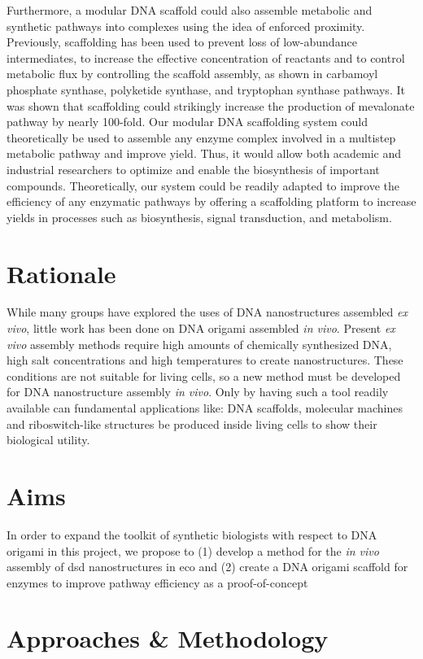\documentclass[a4paper]{article}
\begin{document}
Furthermore, a modular DNA scaffold could also assemble metabolic and synthetic pathways into complexes using the idea of enforced proximity.
Previously, scaffolding has been used to prevent loss of low-abundance intermediates, to increase the effective concentration of reactants and to control metabolic flux by controlling the scaffold assembly, as shown in carbamoyl phosphate synthase, polyketide synthase, and tryptophan synthase pathways\cite{intro13,intro14,intro15}.
It was shown that scaffolding could strikingly increase the production of mevalonate pathway by nearly 100-fold\cite{intro16}.
Our modular DNA scaffolding system could theoretically be used to assemble any enzyme complex involved in a multistep metabolic pathway and improve yield.
Thus, it would allow both academic and industrial researchers to optimize and enable the biosynthesis of important compounds.
Theoretically, our system could be readily adapted to improve the efficiency of any enzymatic pathways by offering a scaffolding platform to increase yields in processes such as biosynthesis, signal transduction, and metabolism\cite{tab7}.
\section*{Rationale}
While many groups have explored the uses of DNA nanostructures assembled \textit{ex vivo}, little work has been done on DNA origami assembled \textit{in vivo}.
Present \textit{ex vivo} assembly methods require high amounts of chemically synthesized DNA, high salt concentrations and high temperatures to create nanostructures.
These conditions are not suitable for living cells, so a new method must be developed for DNA nanostructure assembly \textit{in vivo}.
Only by having such a tool readily available can fundamental applications like: DNA scaffolds,  molecular machines and riboswitch-like structures be produced inside living cells to show their biological utility.
\section*{Aims}
In order to expand the toolkit of synthetic biologists with respect to DNA origami in this project, we propose to (1) develop a method for the \textit{in vivo} assembly of \ac{dsd} nanostructures in \ac{eco} and (2) create a DNA origami scaffold for enzymes to improve pathway efficiency as a proof-of-concept
\section*{Approaches \& Methodology}
\end{document}
